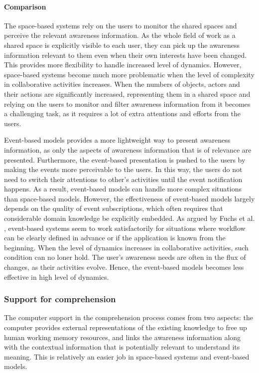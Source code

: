 
\paragraph*{Comparison} %
\label{par:comparison}
The space-based systems rely on the users to monitor the shared spaces and perceive the relevant awareness information. As the whole field of work as a shared space is explicitly visible to each user, they can pick up the awareness information relevant to them even when their own interests have been changed. This provides more flexibility to handle increased level of dynamics. However, space-based systems become much more problematic when the level of complexity in collaborative activities increases. When the numbers of objects, actors and their actions are significantly increased, representing them in a shared space and relying on the users to monitor and filter awareness information from it becomes a challenging task, as it requires a lot of extra attentions and efforts from the users.

Event-based models provides a more lightweight way to present awareness information, as only the aspects of awareness information that is of relevance are presented. Furthermore, the event-based presentation is pushed to the users by making the events more perceivable to the users. In this way, the users do not need to switch their attentions to other’s activities until the event notification happens. As a result, event-based models can handle more complex situations than space-based models. However, the effectiveness of event-based models largely depends on the quality of event subscriptions, which often requires that considerable domain knowledge be explicitly embedded. As argued by Fuchs et al. \cite{fuchs1999a}, event-based systems seem to work satisfactorily for situations where workflow can be clearly defined in advance or if the application is known from the beginning. When the level of dynamics increases in collaborative activities, such condition can no loner hold. The user's awareness needs are often in the flux of changes, as their activities evolve. Hence, the event-based models becomes less effective in high level of dynamics.

\subsubsection{Support for comprehension} %
\label{ssub:support_for_comprehension}
The computer support in the comprehension process comes from two aspects: the computer provides external representations of the existing knowledge to free up human working memory resources, and links the awareness information along with the contextual information that is potentially relevant to understand its meaning. This is relatively an easier job in space-based systems and event-based models.

